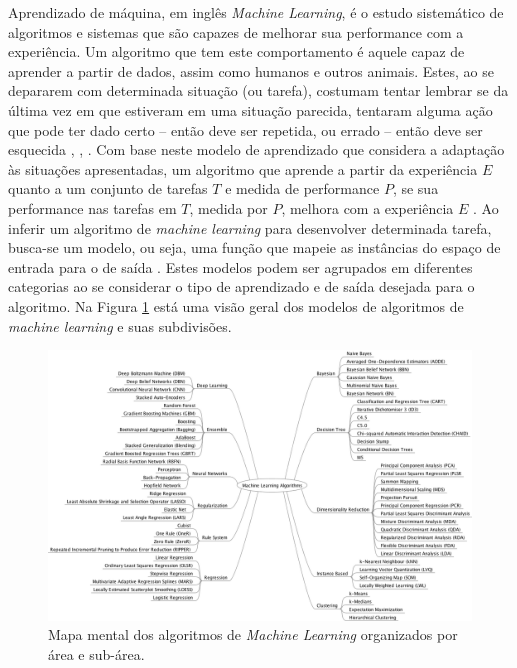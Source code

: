
Aprendizado de máquina, em inglês \emph{Machine Learning}, é o estudo sistemático de algoritmos e sistemas que são capazes de melhorar sua performance com a experiência. Um algoritmo que tem este comportamento é aquele capaz de aprender a partir de dados, assim como humanos e outros animais. Estes, ao se depararem com determinada situação (ou tarefa), costumam tentar lembrar se da última vez em que estiveram em uma situação parecida, tentaram alguma ação que pode ter dado certo -- então deve ser repetida, ou errado -- então deve ser esquecida \cite{marsland2015machine}, \cite{goodfellow2016deep}, \cite{flach2012machine}. Com base neste modelo de aprendizado que considera a adaptação às situações apresentadas, um algoritmo que aprende a partir da experiência $E$ quanto a um conjunto de tarefas $T$ e medida de performance $P$, se sua performance nas tarefas em $T$, medida por $P$, melhora com a experiência $E$ \cite{mitchell1997machine}. Ao inferir um algoritmo de \emph{machine learning} para desenvolver determinada tarefa, busca-se um modelo, ou seja, uma função que mapeie as instâncias do espaço de entrada para o de saída \cite{flach2012machine}. Estes modelos podem ser agrupados em diferentes categorias ao se considerar o tipo de aprendizado e de saída desejada para o algoritmo. Na Figura \ref{fig:ml_algorithms} está uma visão geral dos modelos de algoritmos de \emph{machine learning} e suas subdivisões.

\begin{figure}
	\includegraphics[width=\linewidth]{img/machinelearningalgorithms.png}
	\caption{Mapa mental dos algoritmos de \emph{Machine Learning} organizados por área e sub-área.}
	\label{fig:ml_algorithms}
\end{figure}


